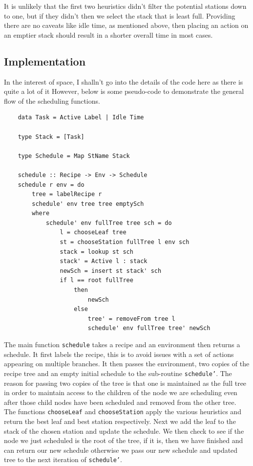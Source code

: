 \documentclass[11pt]{article}
\begin{document}
\medbreak

It is unlikely that the first two heuristics didn't filter the potential stations down to one, but if they
didn't then we select the stack that is least full. Providing there are no caveats like idle time, as mentioned
above, then placing an action on an emptier stack should result in a shorter overall time in most cases.

\subsection{Implementation}

In the interest of space, I shalln't go into the details of the code here as there is quite a lot of it
However, below is some pseudo-code to demonstrate the general flow of the scheduling functions.

\begin{lstlisting}
    data Task = Active Label | Idle Time

    type Stack = [Task]

    type Schedule = Map StName Stack

    schedule :: Recipe -> Env -> Schedule
    schedule r env = do
        tree = labelRecipe r
        schedule' env tree tree emptySch
        where
            schedule' env fullTree tree sch = do
                l = chooseLeaf tree
                st = chooseStation fullTree l env sch
                stack = lookup st sch
                stack' = Active l : stack
                newSch = insert st stack' sch
                if l == root fullTree
                    then
                        newSch
                    else
                        tree' = removeFrom tree l
                        schedule' env fullTree tree' newSch
\end{lstlisting}

The main function \texttt{schedule} takes a recipe and an environment then returns a schedule.
It first labels the recipe, this is to avoid issues with a set of actions appearing on multiple
branches. It then passes the environment, two copies of the recipe tree and an empty initial
schedule to the sub-routine \texttt{schedule'}. The reason for passing two copies of the tree
is that one is maintained as the full tree in order to maintain access to the children of the
node we are scheduling even after those child nodes have been scheduled and removed from the other
tree. The functions \texttt{chooseLeaf} and \texttt{chooseStation} apply the various heuristics
and return the best leaf and best station respectively. Next we add the leaf to the stack of
the chosen station and update the schedule. We then check to see if the node we just
scheduled is the root of the tree, if it is, then we have finished and can return our new schedule
otherwise we pass our new schedule and updated tree to the next iteration of \texttt{schedule'}.
\end{document}
